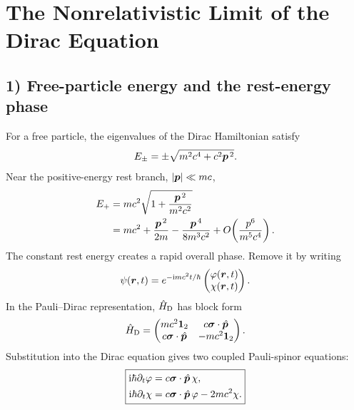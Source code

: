 \section{The Nonrelativistic Limit of the Dirac Equation}
\subsection*{1) Free-particle energy and the rest-energy phase}
For a free particle, the eigenvalues of the Dirac Hamiltonian satisfy
\begin{equation}
 E_\pm=\pm\sqrt{m^2c^4+c^2\bm{p}^{\,2}}.
\end{equation}
Near the positive-energy rest branch, $|\bm{p}|\ll mc$,
\begin{equation}
\begin{aligned}
E_+&=mc^2\sqrt{1+\frac{\bm{p}^{\,2}}{m^2c^2}}\\
&=mc^2+\frac{\bm{p}^{\,2}}{2m}-\frac{\bm{p}^{\,4}}{8m^3c^2}
  +O\!\left(\frac{p^6}{m^5c^4}\right).
\end{aligned}
\end{equation}
The constant rest energy creates a rapid overall phase. Remove it by writing
\begin{equation}
 \psi(\bm{r},t)=e^{-\mathrm{i} mc^2t/\hbar}
 \begin{pmatrix}\varphi(\bm{r},t)\\\chi(\bm{r},t)\end{pmatrix}.
\end{equation}
In the Pauli--Dirac representation, $\hat{H}_{\mathrm D}$ has block form
\begin{equation}
 \hat{H}_{\mathrm D}=\begin{pmatrix}mc^2\mathbf1_2&c\bm{\sigma}\cdot\hat{\bm{p}}\\
 c\bm{\sigma}\cdot\hat{\bm{p}}&-mc^2\mathbf1_2\end{pmatrix}.
\end{equation}
Substitution into the Dirac equation gives two coupled Pauli-spinor equations:
\begin{equation}\label{eq:dirac-two-spinors}
\boxed{\begin{aligned}
\mathrm{i}\hbar\partial_t\varphi&=c\bm{\sigma}\cdot\hat{\bm{p}}\,\chi,\\
\mathrm{i}\hbar\partial_t\chi&=c\bm{\sigma}\cdot\hat{\bm{p}}\,\varphi-2mc^2\chi.
\end{aligned}}
\end{equation}
